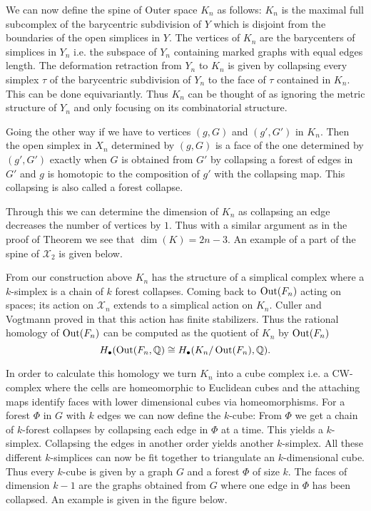 We can now define the spine of Outer space $K_{n}$ as follows:
$K_{n}$ is the maximal full subcomplex of the barycentric subdivision of $Y$ which is disjoint from the boundaries of the open simplices in $Y$.
The vertices of $K_{n}$ are the barycenters of simplices in $Y_{n}$ i.e. the subspace of $Y_{n}$ containing marked graphs 
with equal edges length. The deformation retraction from $Y_{n}$ to $K_{n}$ is given by
collapsing every simplex $\tau$ of the barycentric subdivision of $Y_{n}$ to the face of $\tau$ contained in $K_{n}$.
This can be done equivariantly.
Thus $K_{n}$ can be thought of as ignoring the metric structure of $Y_{n}$ and only focusing on its combinatorial structure.

Going the other way if we have to vertices $(g,G)$ and $(g',G')$ in $K_{n}$. Then the open simplex in $X_{n}$ 
determined by $(g,G)$ is a face of  the one determined by $(g',G')$ exactly when $G$ is obtained from $G'$ 
by collapsing a forest of edges in $G'$ and  $g$ is homotopic to the composition of $g'$ with the collapsing map.
This collapsing is also called a forest collapse.

Through this we can determine the dimension of $K_{n}$ as collapsing an edge decreases the number of vertices by $1$.
Thus with a similar argument as in the proof of Theorem \label{thm:finGenCn} we see that $\dim(K) = 2n -3$.
An example of a part of the spine of $\mathcal{X}_{2}$ is given below.

From our construction above $K_{n}$ has the structure of a simplical complex where a $k$-simplex
is a chain of $k$ forest collapses. Coming back to $\operatorname{Out}(F_{n})$ acting on spaces; its action on $\mathcal{X}_{n}$ extends to a simplical action on $K_{n}$.
Culler and Vogtmann proved in \cite{vogtmann86} that this action has finite stabilizers.
Thus the rational homology of $\operatorname{Out}(F_{n})$ can be computed as the quotient of $K_{n}$ by $\operatorname{Out}(F_{n})$
\[
	H_{\bullet}(\operatorname{Out}(F_{n},\mathbb{Q}) \cong H_{\bullet}(K_{n}/ \operatorname{Out}(F_{n}),\mathbb{Q})
.\] 

In order to calculate this homology we turn $K_{n}$ into a cube complex i.e. a CW-complex where the cells are homeomorphic
to Euclidean cubes and the attaching maps identify faces with lower dimensional cubes via homeomorphisms.
For a forest $\Phi$ in $G$ with $k$ edges we can now define the $k$-cube:
From $\Phi$ we get a chain of $k$-forest collapses by collapsing each edge in $\Phi$ at a time.
This yields a $k$-simplex. Collapsing the edges in another order yields another $k$-simplex.
All these different $k$-simplices can now be fit together to triangulate an $k$-dimensional cube.
Thus every $k$-cube is given by a graph $G$ and a forest $\Phi$ of size $k$.
The faces of dimension $k-1$ are the graphs obtained from $G$ where one edge in $\Phi$ has been collapsed.
An example is given in the figure below.

